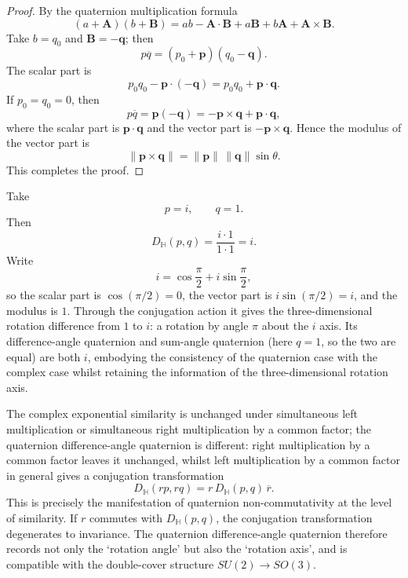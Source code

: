\begin{proof}
By the quaternion multiplication formula
\[
(a+\mathbf A)(b+\mathbf B)
=
ab-\mathbf A\cdot\mathbf B
+
a\mathbf B+b\mathbf A+\mathbf A\times\mathbf B.
\]
Take $b=q_0$ and $\mathbf B=-\mathbf q$; then
\[
p\overline q=(p_0+\mathbf p)(q_0-\mathbf q).
\]
The scalar part is
\[
p_0q_0-\mathbf p\cdot(-\mathbf q)=p_0q_0+\mathbf p\cdot\mathbf q.
\]
If $p_0=q_0=0$, then
\[
p\overline q=\mathbf p(-\mathbf q)=-\mathbf p\times\mathbf q+\mathbf p\cdot\mathbf q,
\]
where the scalar part is $\mathbf p\cdot\mathbf q$ and the vector part is $-\mathbf p\times\mathbf q$. Hence the modulus of the vector part is
\[
\|\mathbf p\times\mathbf q\|=\|\mathbf p\|\,\|\mathbf q\|\sin\theta.
\]
This completes the proof.
\end{proof}

\begin{example}\label{ex:quaternion_exp_similarity_example}
Take
\[
p=i,\qquad q=1.
\]
Then
\[
D_{\mathbb H}(p,q)=\frac{i\cdot 1}{1\cdot 1}=i.
\]
Write
\[
i=\cos\frac{\pi}{2}+i\sin\frac{\pi}{2},
\]
so the scalar part is $\cos(\pi/2)=0$, the vector part is $i\sin(\pi/2)=i$, and the modulus is $1$. Through the conjugation action it gives the three-dimensional rotation difference from $1$ to $i$: a rotation by angle $\pi$ about the $i$ axis. Its difference-angle quaternion and sum-angle quaternion (here $q=1$, so the two are equal) are both $i$, embodying the consistency of the quaternion case with the complex case whilst retaining the information of the three-dimensional rotation axis.
\end{example}

\begin{remark}\label{rem:quaternion_exp_similarity_noncommutative}
The complex exponential similarity is unchanged under simultaneous left multiplication or simultaneous right multiplication by a common factor; the quaternion difference-angle quaternion is different: right multiplication by a common factor leaves it unchanged, whilst left multiplication by a common factor in general gives a conjugation transformation
\[
D_{\mathbb H}(rp,rq)=r\,D_{\mathbb H}(p,q)\,\overline r.
\]
This is precisely the manifestation of quaternion non-commutativity at the level of similarity. If $r$ commutes with $D_{\mathbb H}(p,q)$, the conjugation transformation degenerates to invariance. The quaternion difference-angle quaternion therefore records not only the `rotation angle' but also the `rotation axis', and is compatible with the double-cover structure $SU(2)\to SO(3)$.
\end{remark}

